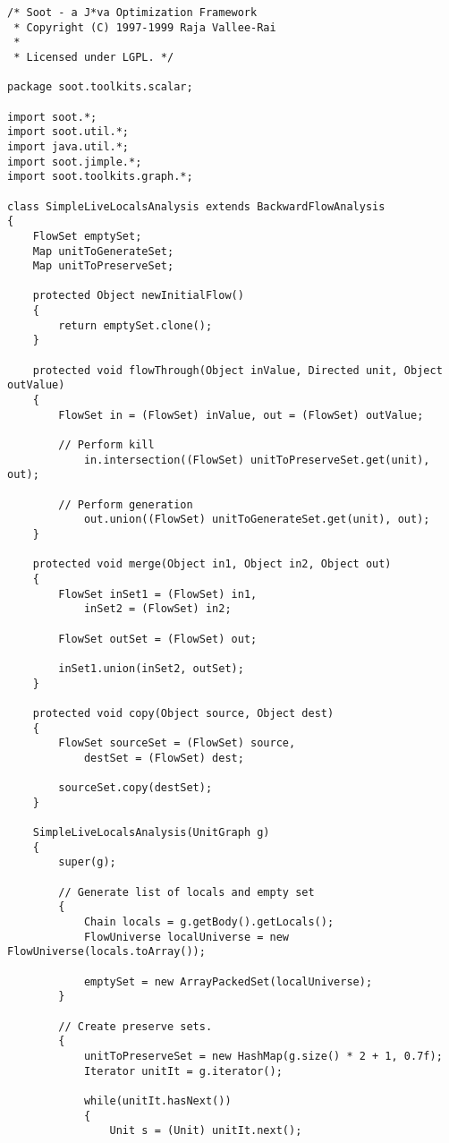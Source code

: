 \documentclass{article}
\begin{document}
\begin{verbatim}
/* Soot - a J*va Optimization Framework
 * Copyright (C) 1997-1999 Raja Vallee-Rai
 *
 * Licensed under LGPL. */

package soot.toolkits.scalar;

import soot.*;
import soot.util.*;
import java.util.*;
import soot.jimple.*;
import soot.toolkits.graph.*;

class SimpleLiveLocalsAnalysis extends BackwardFlowAnalysis
{
    FlowSet emptySet;
    Map unitToGenerateSet;
    Map unitToPreserveSet;

    protected Object newInitialFlow()
    {
        return emptySet.clone();
    }
	
    protected void flowThrough(Object inValue, Directed unit, Object outValue)
    {
        FlowSet in = (FlowSet) inValue, out = (FlowSet) outValue;

        // Perform kill
            in.intersection((FlowSet) unitToPreserveSet.get(unit), out);

        // Perform generation
            out.union((FlowSet) unitToGenerateSet.get(unit), out);
    }

    protected void merge(Object in1, Object in2, Object out)
    {
        FlowSet inSet1 = (FlowSet) in1,
            inSet2 = (FlowSet) in2;

        FlowSet outSet = (FlowSet) out;

        inSet1.union(inSet2, outSet);
    }
    
    protected void copy(Object source, Object dest)
    {
        FlowSet sourceSet = (FlowSet) source,
            destSet = (FlowSet) dest;
            
        sourceSet.copy(destSet);
    }

    SimpleLiveLocalsAnalysis(UnitGraph g)
    {
        super(g);

        // Generate list of locals and empty set
        {
            Chain locals = g.getBody().getLocals();
            FlowUniverse localUniverse = new FlowUniverse(locals.toArray());

            emptySet = new ArrayPackedSet(localUniverse);            
        }

        // Create preserve sets.
        {
            unitToPreserveSet = new HashMap(g.size() * 2 + 1, 0.7f);
            Iterator unitIt = g.iterator();

            while(unitIt.hasNext())
            {
                Unit s = (Unit) unitIt.next();


\end{verbatim}
\end{document}
